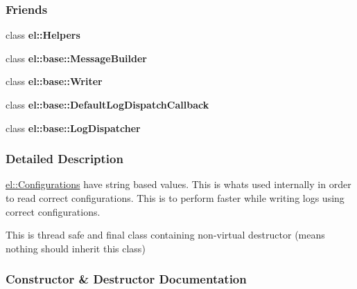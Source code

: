 \subsubsection*{Friends}
\begin{DoxyCompactItemize}
\item 
\hypertarget{a00092_a2fb8a2c02cbf86247f093c118bed877a}{}class {\bfseries el\+::\+Helpers}\label{a00092_a2fb8a2c02cbf86247f093c118bed877a}

\item 
\hypertarget{a00092_a81bbf6fe31fab133d182efa8367304f1}{}class {\bfseries el\+::base\+::\+Message\+Builder}\label{a00092_a81bbf6fe31fab133d182efa8367304f1}

\item 
\hypertarget{a00092_a7a728edbb2761d151832daa74d5b2736}{}class {\bfseries el\+::base\+::\+Writer}\label{a00092_a7a728edbb2761d151832daa74d5b2736}

\item 
\hypertarget{a00092_a42b1de96d584ae4fecbfc2b9aff95052}{}class {\bfseries el\+::base\+::\+Default\+Log\+Dispatch\+Callback}\label{a00092_a42b1de96d584ae4fecbfc2b9aff95052}

\item 
\hypertarget{a00092_a9b37b28ea1c5f8f862cc89f135711d92}{}class {\bfseries el\+::base\+::\+Log\+Dispatcher}\label{a00092_a9b37b28ea1c5f8f862cc89f135711d92}

\end{DoxyCompactItemize}


\subsubsection{Detailed Description}
\hyperlink{a00014}{el\+::\+Configurations} have string based values. This is whats used internally in order to read correct configurations. This is to perform faster while writing logs using correct configurations.

This is thread safe and final class containing non-\/virtual destructor (means nothing should inherit this class) 

\subsubsection{Constructor \& Destructor Documentation}
\hypertarget{a00092_a1b6d90479bb79da27c3e351a9be593ae}{}
